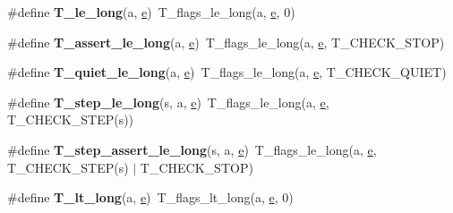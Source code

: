 \begin{DoxyCompactItemize}
\#define {\bfseries T\+\_\+le\+\_\+long}(a,  \mbox{\hyperlink{sun4u_2tte_8h_a8b0b9ed08e0e18920ec2682f48228c27}{e}})~T\+\_\+flags\+\_\+le\+\_\+long(a, \mbox{\hyperlink{sun4u_2tte_8h_a8b0b9ed08e0e18920ec2682f48228c27}{e}}, 0)
\item 
\mbox{\label{group__RTEMSTestFrameworkChecksLong_gafa902f48ee797a2ae31d819bc2ddcb7a}} 
\#define {\bfseries T\+\_\+assert\+\_\+le\+\_\+long}(a,  \mbox{\hyperlink{sun4u_2tte_8h_a8b0b9ed08e0e18920ec2682f48228c27}{e}})~T\+\_\+flags\+\_\+le\+\_\+long(a, \mbox{\hyperlink{sun4u_2tte_8h_a8b0b9ed08e0e18920ec2682f48228c27}{e}}, T\+\_\+\+C\+H\+E\+C\+K\+\_\+\+S\+T\+OP)
\item 
\mbox{\label{group__RTEMSTestFrameworkChecksLong_ga51a2be4db57546a02598b63fa41fd77f}} 
\#define {\bfseries T\+\_\+quiet\+\_\+le\+\_\+long}(a,  \mbox{\hyperlink{sun4u_2tte_8h_a8b0b9ed08e0e18920ec2682f48228c27}{e}})~T\+\_\+flags\+\_\+le\+\_\+long(a, \mbox{\hyperlink{sun4u_2tte_8h_a8b0b9ed08e0e18920ec2682f48228c27}{e}}, T\+\_\+\+C\+H\+E\+C\+K\+\_\+\+Q\+U\+I\+ET)
\item 
\mbox{\label{group__RTEMSTestFrameworkChecksLong_ga58012ce0b0b8cd317bc64d5c527f7d0a}} 
\#define {\bfseries T\+\_\+step\+\_\+le\+\_\+long}(s,  a,  \mbox{\hyperlink{sun4u_2tte_8h_a8b0b9ed08e0e18920ec2682f48228c27}{e}})~T\+\_\+flags\+\_\+le\+\_\+long(a, \mbox{\hyperlink{sun4u_2tte_8h_a8b0b9ed08e0e18920ec2682f48228c27}{e}}, T\+\_\+\+C\+H\+E\+C\+K\+\_\+\+S\+T\+EP(s))
\item 
\mbox{\label{group__RTEMSTestFrameworkChecksLong_gafd8545b1323613e5db50596fc350ad33}} 
\#define {\bfseries T\+\_\+step\+\_\+assert\+\_\+le\+\_\+long}(s,  a,  \mbox{\hyperlink{sun4u_2tte_8h_a8b0b9ed08e0e18920ec2682f48228c27}{e}})~T\+\_\+flags\+\_\+le\+\_\+long(a, \mbox{\hyperlink{sun4u_2tte_8h_a8b0b9ed08e0e18920ec2682f48228c27}{e}}, T\+\_\+\+C\+H\+E\+C\+K\+\_\+\+S\+T\+EP(s) $\vert$ T\+\_\+\+C\+H\+E\+C\+K\+\_\+\+S\+T\+OP)
\item 
\mbox{\label{group__RTEMSTestFrameworkChecksLong_gac70ea2ac62525313cd40922add6da1df}} 
\#define {\bfseries T\+\_\+lt\+\_\+long}(a,  \mbox{\hyperlink{sun4u_2tte_8h_a8b0b9ed08e0e18920ec2682f48228c27}{e}})~T\+\_\+flags\+\_\+lt\+\_\+long(a, \mbox{\hyperlink{sun4u_2tte_8h_a8b0b9ed08e0e18920ec2682f48228c27}{e}}, 0)

\end{DoxyCompactItemize}

